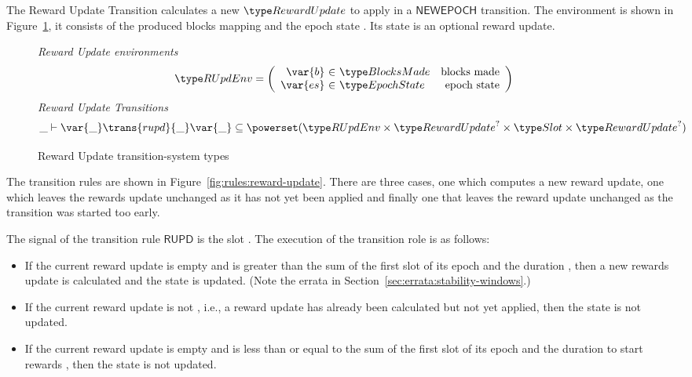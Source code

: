 The Reward Update Transition calculates a new $\RewardUpdate$ to apply in a
$\mathsf{NEWEPOCH}$ transition. The environment is shown in
Figure~\ref{fig:ts-types:reward-update}, it consists of the produced blocks
mapping  and the epoch state . Its state is an optional reward
update.

\begin{figure}
  \emph{Reward Update environments}
  \begin{equation*}
    \RUpdEnv =
    \left(
      \begin{array}{r@{~\in~}lr}
        \var{b} & \BlocksMade & \text{blocks made} \\
        \var{es} & \EpochState & \text{epoch state} \\
      \end{array}
    \right)
  \end{equation*}
  \emph{Reward Update Transitions}
  \begin{equation*}
    \_ \vdash \var{\_} \trans{rupd}{\_} \var{\_} \subseteq
    \powerset (\RUpdEnv \times \RewardUpdate^? \times \Slot \times \RewardUpdate^?)
  \end{equation*}
  \caption{Reward Update transition-system types}
  \label{fig:ts-types:reward-update}
\end{figure}

The transition rules are shown in Figure~\ref{fig:rules:reward-update}. There
are three cases, one which computes a new reward update, one which leaves the
rewards update unchanged as it has not yet been applied and finally one that
leaves the reward update unchanged as the transition was started too early.

The signal of the transition rule $\mathsf{RUPD}$ is the slot . The
execution of the transition role is as follows:

\begin{itemize}
\item If the current reward update  is empty and  is greater than
  the sum of the first slot of its epoch and the duration \RandomnessStabilisationWindow, then a
  new rewards update is calculated and the state is updated.
  (Note the errata in Section~\ref{sec:errata:stability-windows}.)
\item If the current reward update  is not \Nothing, i.e., a reward
  update has already been calculated but not yet applied, then the state is not updated.
\item If the current reward update  is empty and  is less than or equal to the sum
  of the first slot of its epoch and the duration to start rewards \RandomnessStabilisationWindow,
  then the state is not updated.
\end{itemize}

